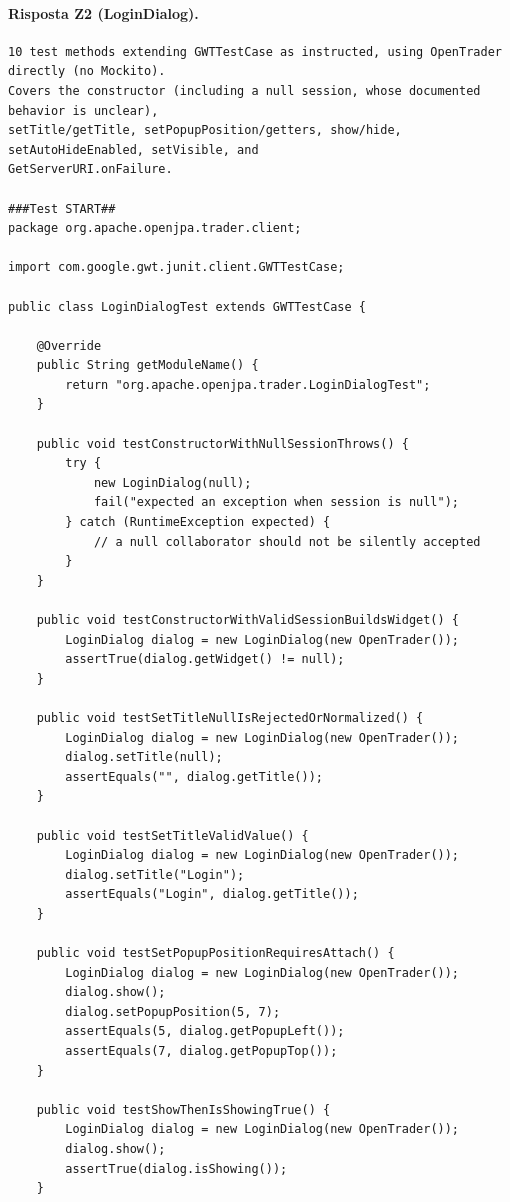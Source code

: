 \paragraph*{Risposta Z2 (LoginDialog).}
\label{risposta:ld-z2}
\begin{lstlisting}
10 test methods extending GWTTestCase as instructed, using OpenTrader directly (no Mockito).
Covers the constructor (including a null session, whose documented behavior is unclear),
setTitle/getTitle, setPopupPosition/getters, show/hide, setAutoHideEnabled, setVisible, and
GetServerURI.onFailure.

###Test START##
package org.apache.openjpa.trader.client;

import com.google.gwt.junit.client.GWTTestCase;

public class LoginDialogTest extends GWTTestCase {

    @Override
    public String getModuleName() {
        return "org.apache.openjpa.trader.LoginDialogTest";
    }

    public void testConstructorWithNullSessionThrows() {
        try {
            new LoginDialog(null);
            fail("expected an exception when session is null");
        } catch (RuntimeException expected) {
            // a null collaborator should not be silently accepted
        }
    }

    public void testConstructorWithValidSessionBuildsWidget() {
        LoginDialog dialog = new LoginDialog(new OpenTrader());
        assertTrue(dialog.getWidget() != null);
    }

    public void testSetTitleNullIsRejectedOrNormalized() {
        LoginDialog dialog = new LoginDialog(new OpenTrader());
        dialog.setTitle(null);
        assertEquals("", dialog.getTitle());
    }

    public void testSetTitleValidValue() {
        LoginDialog dialog = new LoginDialog(new OpenTrader());
        dialog.setTitle("Login");
        assertEquals("Login", dialog.getTitle());
    }

    public void testSetPopupPositionRequiresAttach() {
        LoginDialog dialog = new LoginDialog(new OpenTrader());
        dialog.show();
        dialog.setPopupPosition(5, 7);
        assertEquals(5, dialog.getPopupLeft());
        assertEquals(7, dialog.getPopupTop());
    }

    public void testShowThenIsShowingTrue() {
        LoginDialog dialog = new LoginDialog(new OpenTrader());
        dialog.show();
        assertTrue(dialog.isShowing());
    }


\end{lstlisting}
